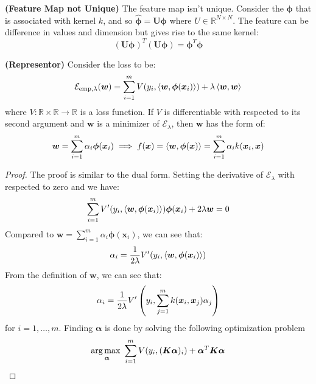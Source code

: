 \begin{remark}{\textbf{(Feature Map not Unique)}}
    The feature map isn't unique. Consider the $\boldsymbol \phi$ that is associated with kernel $k$, and so $\hat{\boldsymbol \phi} = \boldsymbol U\boldsymbol \phi$ where $U \in \mathbb{R}^{N\times N}$. The feature can be difference in values and dimension but gives rise to the same kernel:
    \begin{equation*}
        (\boldsymbol U\boldsymbol \phi)^T(\boldsymbol U\boldsymbol \phi) = \boldsymbol \phi^T\boldsymbol \phi
    \end{equation*}
\end{remark}

\begin{theorem}{\textbf{(Representor)}}
    Consider the loss to be:
    \begin{equation*}
        \mathcal{E}_{\text{emp}, \lambda}(\boldsymbol w) = \sum^m_{i=1} V(y_i, \left\langle \boldsymbol w, \boldsymbol \phi(\boldsymbol x_i) \right\rangle) + \lambda\left\langle \boldsymbol w, \boldsymbol w \right\rangle
    \end{equation*}
    where $V: \mathbb{R}\times \mathbb{R}\rightarrow \mathbb{R}$ is a loss function. If $V$ is differentiable with respected to its second argument and $\boldsymbol w$ is a minimizer of $\mathcal{E}_\lambda$, then $\boldsymbol w$ has the form of:
    \begin{equation*}
        \boldsymbol w = \sum^m_{i=1}\alpha_i\boldsymbol \phi(\boldsymbol x_i) \implies f(\boldsymbol x) = \left\langle \boldsymbol w, \boldsymbol \phi(\boldsymbol x) \right\rangle = \sum^m_{i=1}\alpha_ik(\boldsymbol x_i, \boldsymbol x)
    \end{equation*}
\end{theorem}
\begin{proof}
    The proof is similar to the dual form. Setting the derivative of $\mathcal{E}_\lambda$ with respected to zero and we have:
    \begin{equation*}
        \sum^m_{i=1}V'(y_i, \left\langle \boldsymbol w, \boldsymbol \phi(\boldsymbol x_i) \right\rangle)\boldsymbol \phi(\boldsymbol x_i) + 2\lambda\boldsymbol w = 0
    \end{equation*}
    Compared to $\boldsymbol w = \sum^m_{i=1}\alpha_i\boldsymbol \phi(\boldsymbol x_i)$, we can see that:
    \begin{equation*}
        \alpha_i = \frac{1}{2\lambda}V'(y_i, \left\langle \boldsymbol w, \boldsymbol \phi(\boldsymbol x_i) \right\rangle)
    \end{equation*}
    From the definition of $\boldsymbol w$, we can see that:
    \begin{equation*}
        \alpha_i = \frac{1}{2\lambda}V'\left( y_i, \sum^m_{j=1}k(\boldsymbol x_i, \boldsymbol x_j)\alpha_j \right)
    \end{equation*}
    for $i=1,\dots,m$. Finding $\boldsymbol \alpha$ is done by solving the following optimization problem
    \begin{equation*}
        \underset{\boldsymbol \alpha}{\arg\max \ } \sum^m_{i=1} V(y_i, (\boldsymbol K\boldsymbol \alpha)_i) + \boldsymbol \alpha^T\boldsymbol K\boldsymbol \alpha
    \end{equation*} 
\end{proof}

